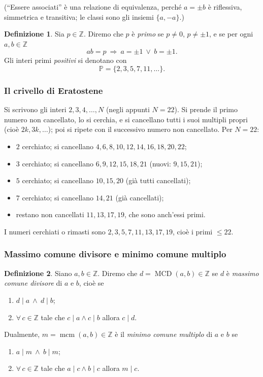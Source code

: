 \documentclass[11pt,a4paper]{article}
\newcommand{\Z}{\mathbb{Z}}
\newcommand{\Prim}{\mathbb{P}}
\theoremstyle{definition}
\newtheorem{definizione}{Definizione}[section]
\theoremstyle{plain}
\theoremstyle{remark}
\begin{document}
(``Essere associati'' è una relazione di equivalenza, perché $a=\pm b$ è riflessiva, simmetrica e transitiva; le classi sono gli insiemi $\{a,-a\}$.)

\begin{definizione}
Sia $p\in\Z$. Diremo che $p$ è \emph{primo} se $p\neq0$, $p\neq\pm1$, e se per ogni $a,b\in\Z$
\[
ab=p\ \Longrightarrow\ a=\pm1\ \vee\ b=\pm1 .
\]
Gli interi primi \emph{positivi} si denotano con
\[
\Prim=\{2,3,5,7,11,\dots\}.
\]
\end{definizione}

\subsubsection*{Il crivello di Eratostene}

Si scrivono gli interi $2,3,4,\dots,N$ (negli appunti $N=22$). Si prende il primo numero non cancellato, lo si cerchia, e si cancellano tutti i suoi multipli propri (cioè $2k,3k,\dots$); poi si ripete con il successivo numero non cancellato. Per $N=22$:
\begin{itemize}[nosep]
\item $2$ cerchiato; si cancellano $4,6,8,10,12,14,16,18,20,22$;
\item $3$ cerchiato; si cancellano $6,9,12,15,18,21$ (nuovi: $9,15,21$);
\item $5$ cerchiato; si cancellano $10,15,20$ (già tutti cancellati);
\item $7$ cerchiato; si cancellano $14,21$ (già cancellati);
\item restano non cancellati $11,13,17,19$, che sono anch'essi primi.
\end{itemize}
I numeri cerchiati o rimasti sono $2,3,5,7,11,13,17,19$, cioè i primi $\le22$.



\subsubsection{Massimo comune divisore e minimo comune multiplo}

\begin{definizione}
Siano $a,b\in\Z$. Diremo che $d=\operatorname{MCD}(a,b)\in\Z$ se $d$ è \emph{massimo comune divisore} di $a$ e $b$, cioè se
\begin{enumerate}[label=\arabic*),nosep]
\item $d\mid a\ \wedge\ d\mid b$;
\item $\forall\,c\in\Z$ tale che $c\mid a\wedge c\mid b$ allora $c\mid d$.
\end{enumerate}
Dualmente, $m=\operatorname{mcm}(a,b)\in\Z$ è il \emph{minimo comune multiplo} di $a$ e $b$ se
\begin{enumerate}[label=\arabic*),nosep]
\item $a\mid m\ \wedge\ b\mid m$;
\item $\forall\,c\in\Z$ tale che $a\mid c\wedge b\mid c$ allora $m\mid c$.
\end{enumerate}
\end{definizione}
\end{document}
